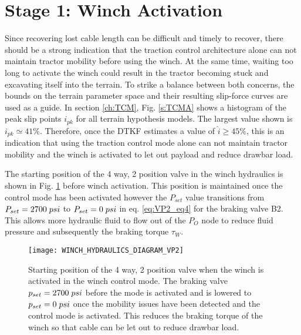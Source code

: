 \section{Stage 1: Winch Activation}

Since recovering lost cable length can be difficult and timely to recover, there should be a strong indication that the traction control architecture alone can not maintain tractor mobility before using the winch. At the same time, waiting too long to activate the winch could result in the tractor becoming stuck and excavating itself into the terrain. To strike a balance between both concerns, the bounds on the terrain parameter space and their resulting slip-force curves are used as a guide. In section \ref{ch:TCM},
Fig. \ref{s:TCMA} shows a histogram of the peak slip points $i_{pk}$ for all terrain hypothesis models. The largest value shown is $i_{pk} \simeq 41\%$. Therefore, once the DTKF estimates a value of $\hat{i} \geq 45\%$, this is an indication that using the traction control mode alone can not maintain tractor mobility and the winch is activated to let out payload and reduce drawbar load. 

The starting position of the 4 way, 2 position valve in the winch hydraulics is shown in Fig. \ref{fig:WINCH_HYDRAULICS_DIAGRAM_VP2} before winch activation. This position is maintained once the control mode has been activated however the $P_{set}$ value transitions from $P_{set} = 2700\hspace{1mm}psi$ to $P_{set} = 0\hspace{1mm}psi$ in eq. \ref{eq:VP2_eq4} for the braking valve B2. This allows more hydraulic fluid to flow out of the $P_O$ node to reduce fluid pressure and subsequently the braking torque $\tau_W$.
\begin{figure}[htb]
    \centering
    \texttt{[image: WINCH\_HYDRAULICS\_DIAGRAM\_VP2]}
    \caption{Starting position of the 4 way, 2 position valve when the winch is activated in the winch control mode. The braking valve $p_{set} = 2700\hspace{1mm}psi$ before the mode is activated and is lowered to $p_{set} = 0\hspace{1mm}psi$ once the mobility issues have been detected and the control mode is activated. This reduces the braking torque of the winch so that cable can be let out to reduce drawbar load.}
    \label{fig:WINCH_HYDRAULICS_DIAGRAM_VP2}
\end{figure}



